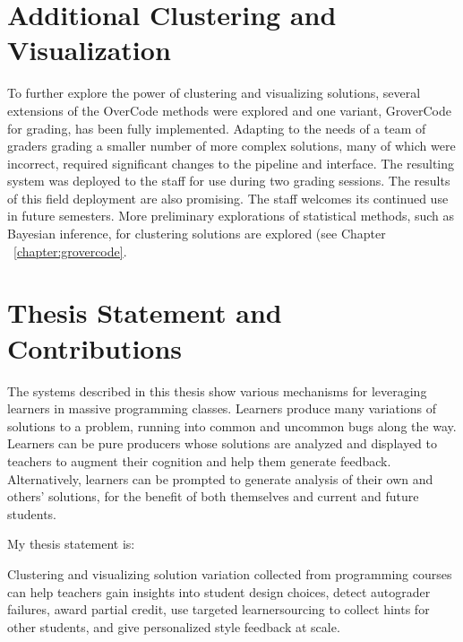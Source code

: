 \section{Additional Clustering and Visualization}

To further explore the power of clustering and visualizing solutions, several extensions of the OverCode methods were explored and one variant, GroverCode for grading, has been fully implemented. Adapting to the needs of a team of graders grading a smaller number of more complex solutions, many of which were incorrect, required significant changes to the pipeline and interface. The resulting system was deployed to the staff for use during two grading sessions. The results of this field deployment are also promising. The staff welcomes its continued use in future semesters. More preliminary explorations of statistical methods, such as Bayesian inference, for clustering solutions are explored (see Chapter ~\ref{chapter:grovercode}.



\section{Thesis Statement and Contributions}

The systems described in this thesis show various mechanisms for leveraging learners in massive programming classes. Learners produce many variations of solutions to a problem, running into common and uncommon bugs along the way. Learners can be pure producers whose solutions are analyzed and displayed to teachers to augment their cognition and help them generate feedback. Alternatively, learners can be prompted to generate analysis of their own and others' solutions, for the benefit of both themselves and current and future students. %

My thesis statement is: 
\begin{displayquote}
Clustering and visualizing solution variation collected from programming courses can help teachers gain insights into student design choices, detect autograder failures, award partial credit, use targeted learnersourcing to collect hints for other students, and give personalized style feedback at scale.
\end{displayquote}


